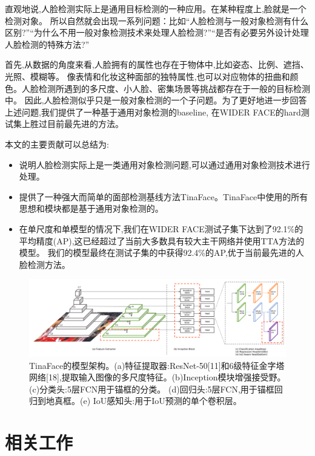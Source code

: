 \documentclass[twocolumn,10pt,a4paper]{article}%
\begin{document}
	直观地说,人脸检测实际上是通用目标检测的一种应用。在某种程度上,脸就是一个检测对象。
	所以自然就会出现一系列问题：比如“人脸检测与一般对象检测有什么区别?”“为什么不用一般对象检测技术来处理人脸检测?”“是否有必要另外设计处理人脸检测的特殊方法?”
	
	首先,从数据的角度来看,人脸拥有的属性也存在于物体中,比如姿态、比例、遮挡、光照、模糊等。
	像表情和化妆这种面部的独特属性,也可以对应物体的扭曲和颜色。人脸检测所遇到的多尺度、小人脸、密集场景等挑战都存在于一般的目标检测中。
	因此,人脸检测似乎只是一般对象检测的一个子问题。为了更好地进一步回答上述问题,我们提供了一种基于通用对象检测的baseline,
	在WIDER FACE的hard测试集上胜过目前最先进的方法。

	本文的主要贡献可以总结为:
	\begin{itemize}
		\item 说明人脸检测实际上是一类通用对象检测问题,可以通过通用对象检测技术进行处理。
		\item 提供了一种强大而简单的面部检测基线方法TinaFace。TinaFace中使用的所有思想和模块都是基于通用对象检测的。
		\item 在单尺度和单模型的情况下,我们在WIDER FACE测试子集下达到了92.1\%的平均精度(AP),这已经超过了当前大多数具有较大主干网络并使用TTA方法的模型。
		我们的模型最终在测试子集的中获得92.4\%的AP,优于当前最先进的人脸检测方法。
	\end{itemize}
	\begin{figure}[ht]%
		\centering
		\begin{minipage}{1\textwidth}%
			\centering
			\includegraphics[width=1.0\textwidth]{architecture.png}%
			\caption{\fontsize{10pt}{15pt}\selectfont 
			TinaFace的模型架构。(a)特征提取器:ResNet-50[11]和6级特征金字塔网络[18],提取输入图像的多尺度特征。(b)Inception模块增强接受野。(c)分类头:5层FCN用于锚框的分类。
			(d)回归头:5层FCN,用于锚框回归到地真框。(e) IoU感知头:用于IoU预测的单个卷积层。
		}%
		\end{minipage}
	\end{figure}	

	\section{相关工作}
\end{document}
